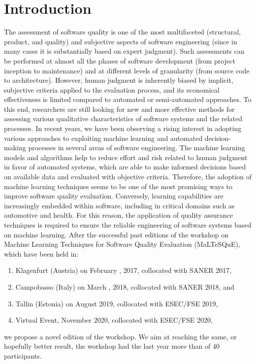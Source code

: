 
\section{Introduction}
\label{sec:motivation}

The assessment of software quality is one of the most multifaceted (\eg structural, product, and quality) and subjective aspects of software engineering (since in many cases it is substantially based on expert judgment).
Such assessments can be performed at almost all the phases of software development (from project inception to maintenance) and at different levels of granularity (from source code to architecture).
However, human judgment is inherently biased by implicit, subjective criteria applied to the evaluation process, and its economical effectiveness is limited compared to automated or semi-automated approaches.
To this end, researchers are still looking for new and more effective methods for assessing various qualitative characteristics of software systems and the related processes.
In recent years, we have been observing a rising interest in adopting various approaches to exploiting machine learning and automated decision-making processes in several areas of software engineering.
The machine learning models and algorithms help to reduce effort and risk related to human judgment in favor of automated systems, which are able to make informed decisions based on available data and evaluated with objective criteria.
Therefore, the adoption of machine learning techniques seems to be one of the most promising ways to improve software quality evaluation.
Conversely, learning capabilities are increasingly embedded within software, including in critical domains such as automotive and health.
For this reason, the application of quality assurance techniques is required to ensure the reliable engineering of software systems based on machine learning.
After the successful past editions of the workshop on Machine Learning Techniques for Software Quality Evaluation (MaLTeSQuE), which have been held in:
\begin{enumerate}
    \item Klagenfurt (Austria) on February , 2017, collocated with SANER 2017,
    \item Campobasso (Italy) on March  , 2018, collocated with SANER 2018, and
    \item Tallin (Estonia) on August  2019, collocated with ESEC/FSE 2019,
    \item Virtual Event, November   2020, collocated with ESEC/FSE 2020,
\end{enumerate}
we propose a novel edition of the workshop.
We aim at reaching the same, or hopefully better result, the workshop had the last year more than of 40 participants.
